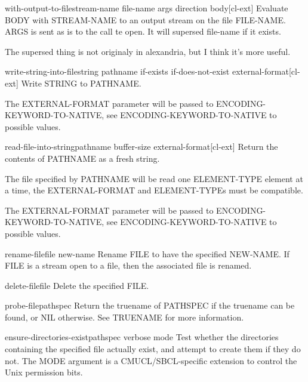 \documentclass[10pt,english]{book}
\begin{document}
\begin{macro}{with-output-to-file}{stream-name file-name \rest args
    \key direction \akeys \body body}[cl-ext]
  Evaluate BODY with STREAM-NAME to an output stream on the file
FILE-NAME. ARGS is sent as is to the call te open. It will supersed
file-name if it exists.
\begin{devnote}
  The supersed thing is not originaly in alexandria, but I think it's
  more useful.
\end{devnote}
\end{macro}

\begin{function}{write-string-into-file}{string pathname \key if-exists if-does-not-exist external-format}[cl-ext]
  Write STRING to PATHNAME.

The EXTERNAL-FORMAT parameter will be passed to
ENCODING-KEYWORD-TO-NATIVE, see ENCODING-KEYWORD-TO-NATIVE to
possible values.
\end{function}

\begin{function}{read-file-into-string}{pathname \key buffer-size external-format}[cl-ext]
  Return the contents of PATHNAME as a fresh string.

The file specified by PATHNAME will be read one ELEMENT-TYPE
element at a time, the EXTERNAL-FORMAT and ELEMENT-TYPEs must be
compatible.

The EXTERNAL-FORMAT parameter will be passed to
ENCODING-KEYWORD-TO-NATIVE, see ENCODING-KEYWORD-TO-NATIVE to
possible values.
\end{function}

\begin{function}{rename-file}{file new-name}
  Rename FILE to have the specified NEW-NAME. If FILE is a stream open to a
  file, then the associated file is renamed.
\end{function}

\begin{function}{delete-file}{file}
  Delete the specified FILE.
\end{function}

\begin{function}{probe-file}{pathspec}
  Return the truename of PATHSPEC if the truename can be found,
or NIL otherwise.  See TRUENAME for more information.
\end{function}

\begin{function}{ensure-directories-exist}{pathspec \key verbose mode}
  Test whether the directories containing the specified file
  actually exist, and attempt to create them if they do not.
  The MODE argument is a CMUCL/SBCL-specific extension to control
  the Unix permission bits.
\end{function}
\end{document}
